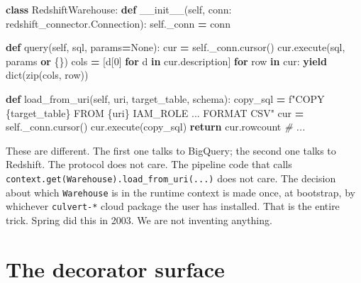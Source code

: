\documentclass[
  11pt,
  british,
  oneside]{book}
\newenvironment{Shaded}{\begin{snugshade}}{\end{snugshade}}
\newcommand{\BuiltInTok}[1]{#1}
\newcommand{\CommentTok}[1]{\textcolor[rgb]{0.56,0.35,0.01}{\textit{#1}}}
\newcommand{\ControlFlowTok}[1]{\textcolor[rgb]{0.13,0.29,0.53}{\textbf{#1}}}
\newcommand{\DecValTok}[1]{\textcolor[rgb]{0.00,0.00,0.81}{#1}}
\newcommand{\FunctionTok}[1]{\textcolor[rgb]{0.00,0.00,0.00}{#1}}
\newcommand{\KeywordTok}[1]{\textcolor[rgb]{0.13,0.29,0.53}{\textbf{#1}}}
\newcommand{\NormalTok}[1]{#1}
\newcommand{\OperatorTok}[1]{\textcolor[rgb]{0.81,0.36,0.00}{\textbf{#1}}}
\newcommand{\SpecialCharTok}[1]{\textcolor[rgb]{0.00,0.00,0.00}{#1}}
\newcommand{\SpecialStringTok}[1]{\textcolor[rgb]{0.31,0.60,0.02}{#1}}
\newcommand{\VariableTok}[1]{\textcolor[rgb]{0.00,0.00,0.00}{#1}}
\begin{document}
\begin{Shaded}
\begin{Highlighting}[]
\KeywordTok{class}\NormalTok{ RedshiftWarehouse:}
    \KeywordTok{def} \FunctionTok{\_\_init\_\_}\NormalTok{(}\VariableTok{self}\NormalTok{, conn: redshift\_connector.Connection):}
        \VariableTok{self}\NormalTok{.\_conn }\OperatorTok{=}\NormalTok{ conn}

    \KeywordTok{def}\NormalTok{ query(}\VariableTok{self}\NormalTok{, sql, params}\OperatorTok{=}\VariableTok{None}\NormalTok{):}
\NormalTok{        cur }\OperatorTok{=} \VariableTok{self}\NormalTok{.\_conn.cursor()}
\NormalTok{        cur.execute(sql, params }\KeywordTok{or}\NormalTok{ \{\})}
\NormalTok{        cols }\OperatorTok{=}\NormalTok{ [d[}\DecValTok{0}\NormalTok{] }\ControlFlowTok{for}\NormalTok{ d }\KeywordTok{in}\NormalTok{ cur.description]}
        \ControlFlowTok{for}\NormalTok{ row }\KeywordTok{in}\NormalTok{ cur:}
            \ControlFlowTok{yield} \BuiltInTok{dict}\NormalTok{(}\BuiltInTok{zip}\NormalTok{(cols, row))}

    \KeywordTok{def}\NormalTok{ load\_from\_uri(}\VariableTok{self}\NormalTok{, uri, target\_table, schema):}
\NormalTok{        copy\_sql }\OperatorTok{=} \SpecialStringTok{f"COPY }\SpecialCharTok{\{}\NormalTok{target\_table}\SpecialCharTok{\}}\SpecialStringTok{ FROM \textquotesingle{}}\SpecialCharTok{\{}\NormalTok{uri}\SpecialCharTok{\}}\SpecialStringTok{\textquotesingle{} IAM\_ROLE ... FORMAT CSV"}
\NormalTok{        cur }\OperatorTok{=} \VariableTok{self}\NormalTok{.\_conn.cursor()}
\NormalTok{        cur.execute(copy\_sql)}
        \ControlFlowTok{return}\NormalTok{ cur.rowcount}
    \CommentTok{\# ...}
\end{Highlighting}
\end{Shaded}

These are different. The first one talks to BigQuery; the second one
talks to Redshift. The protocol does not care. The pipeline code that
calls \texttt{context.get(Warehouse).load\_from\_uri(...)} does not
care. The decision about which \texttt{Warehouse} is in the runtime
context is made once, at bootstrap, by whichever \texttt{culvert-*}
cloud package the user has installed. That is the entire trick. Spring
did this in 2003. We are not inventing anything.

\hypertarget{the-decorator-surface}{%
\section{The decorator surface}\label{the-decorator-surface}}
\end{document}

